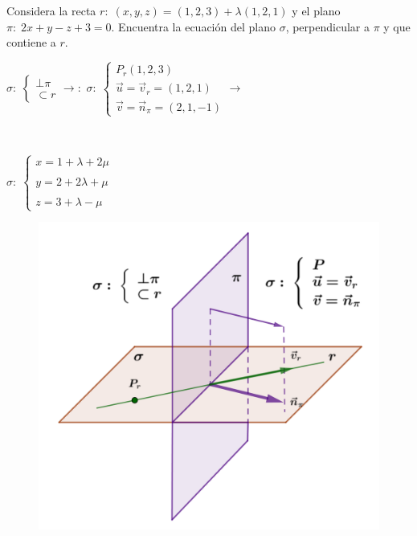 \begin{ejre}
	Considera la recta $r:\;(x,y,z)=(1,2,3)+\lambda(1,2,1)$ y el plano $\pi:\; 2x+y-z+3=0$. Encuentra la ecuación del plano $\sigma$, perpendicular a $\pi$ y que contiene a $r$.
\end{ejre}



\begin{proofw}\renewcommand{\qedsymbol}{$\diamond$}

$\sigma:\; \begin{cases} \bot \pi \\ \subset r \end{cases} \to:$
$\sigma:\; \begin{cases} P_r(1,2,3) \\ \vec u=\vec v_r=(1,2,1) \\ \vec v= \vec n_{\pi}=(2,1,-1) \end{cases} \to $
\begin{multicols}{2}
$\quad$

\noindent  $\sigma:\; \begin{cases} x=1+\lambda+2\mu \\ \\ y=2+2\lambda+\mu \\ \\ z=3+\lambda-\mu \end{cases}$	
\begin{figure}[H]
		\centering
		\includegraphics[width=.4\textwidth]{imagenes/imagenes10/T10IM24.png}
 	\end{figure}
\end{multicols}	
\end{proofw}



